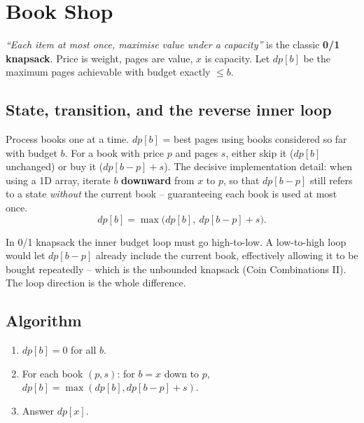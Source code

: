 \section{Book Shop}
\label{sec:cses-book-shop}


\begin{patternbox}
\emph{``Each item at most once, maximise value under a capacity''} is the
classic \textbf{0/1 knapsack}. Price is weight, pages are value, $x$ is
capacity. Let $\textit{dp}[b]$ be the maximum pages achievable with
budget exactly $\le b$.
\end{patternbox}

\subsection*{State, transition, and the reverse inner loop}

Process books one at a time. $\textit{dp}[b]$ = best pages using books
considered so far with budget $b$. For a book with price $p$ and pages
$s$, either skip it ($\textit{dp}[b]$ unchanged) or buy it
($\textit{dp}[b-p]+s$). The decisive implementation detail: when using a
1D array, iterate $b$ \textbf{downward} from $x$ to $p$, so that
$\textit{dp}[b-p]$ still refers to a state \emph{without} the current
book -- guaranteeing each book is used at most once.
\[
  \textit{dp}[b]=\max\big(\textit{dp}[b],\ \textit{dp}[b-p]+s\big).
\]

\begin{ideabox}
In 0/1 knapsack the inner budget loop must go high-to-low. A low-to-high
loop would let $\textit{dp}[b-p]$ already include the current book,
effectively allowing it to be bought repeatedly -- which is the unbounded
knapsack (Coin Combinations II). The loop direction is the whole
difference.
\end{ideabox}

\subsection*{Algorithm}

\begin{enumerate}
  \item $\textit{dp}[b]=0$ for all $b$.
  \item For each book $(p,s)$: for $b=x$ down to $p$,
        $\textit{dp}[b]=\max(\textit{dp}[b],\textit{dp}[b-p]+s)$.
  \item Answer $\textit{dp}[x]$.
\end{enumerate}

